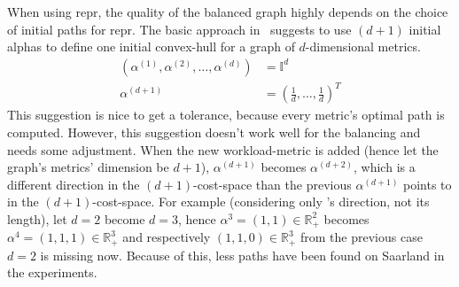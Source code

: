         When using \gls{repr}, the quality of the balanced graph highly depends on the choice of initial paths for \gls{repr}.
        The basic approach in~\cite{barth:alternative_multicriteria_routes} suggests to use $(d+1)$ initial alphas to define one initial convex-hull for a graph of $d$-dimensional \glspl{metric}.
        \begin{equation}
        \label{eq:init_alphas}
        \begin{aligned}
            \left( \alpha^{(1)}, \alpha^{(2)}, \dots, \alpha^{(d)} \right) &= \mathbb{I}^d\\
            \alpha^{(d+1)} &= \left( \frac{1}{d}, \dots, \frac{1}{d} \right)^T
        \end{aligned}
        \end{equation}
        This suggestion is nice to get a tolerance, because every \gls{metric}'s optimal path is computed.
        However, this suggestion doesn't work well for the \gls{balancing} and needs some adjustment.
        When the new workload-\gls{metric} is added (hence let the graph's \glspl{metric}' dimension be $d+1$), $\alpha^{(d+1)}$ becomes $\alpha^{(d+2)}$, which is a different direction in the $(d+1)$-cost-space than the previous $\alpha^{(d+1)}$ points to in the $(d+1)$-cost-space.
        For example (considering only \alpha's direction, not its length), let $d=2$ become $d=3$, hence $\alpha^3=(1, 1) \in \mathbb{R}_+^2$ becomes $\alpha^4=(1, 1, 1) \in \mathbb{R}_+^3$ and respectively $(1, 1, 0) \in \mathbb{R}_+^3$ from the previous case $d=2$ is missing now.
        Because of this, less paths have been found on Saarland in the experiments.
